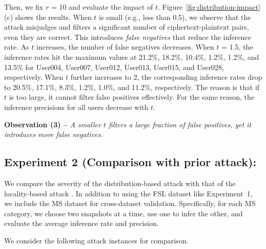 Then, we fix $r$ = 10 and evaluate the impact of $t$.  Figure~\ref{fig:distribution-impact}(c) shows the results. When $t$ is small (e.g., less than 0.5), we observe that the attack misjudges and filters a significant number of ciphertext-plaintext pairs, even they are correct. This introduces {\em false negatives} that reduce the inference rate. As $t$ increases, the number of false negatives decreases.  When $t$ = 1.5, the inference rates hit the maximum values at 21.2\%, 18.2\%, 10.4\%, 1.2\%, 1.2\%, and 13.5\% for User004, User007, User012, User013, User015, and User028, respectively. When $t$ further increases to 2, the corresponding inference rates drop to 20.5\%, 17.1\%, 8.3\%, 1.2\%, 1.0\%, and 11.2\%, respectively. The reason is that if $t$ is too large, it cannot filter false positives effectively. For the same reason, the inference precisions for all users decrease with $t$.  

{\bf Observation (3) --} {\em A smaller $t$ filters a large fraction of false
positives, yet it introduces more false negatives.}   


\subsection{Experiment 2 (Comparison with prior attack):}
We compare the severity of the distribution-based attack with that of the locality-based attack \cite{li17}. In addition to using the FSL dataset like Experiment~1, we include the MS dataset for cross-dataset validation. Specifically, for each MS category, we choose two snapshots at a time, use one to infer the other, and evaluate the average inference rate and precision. 

We consider the following attack instances for comparison. 

